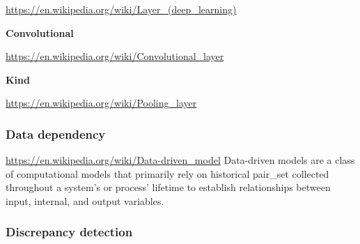 \documentclass{book}
\providecommand{\ProjectDeepHeading}[2]{%
    \par\medskip\noindent\textbf{#2}\par\smallskip
}
\begin{document}
\url{https://en.wikipedia.org/wiki/Layer_(deep_learning)}

\ProjectDeepHeading{1}{Convolutional}


\url{https://en.wikipedia.org/wiki/Convolutional_layer}

\ProjectDeepHeading{1}{Kind}


\url{https://en.wikipedia.org/wiki/Pooling_layer}

\subsubsection{Data dependency}


\url{https://en.wikipedia.org/wiki/Data-driven_model}
Data-driven models are a class of computational models that primarily rely on historical pair_set collected throughout a system's or process' lifetime to establish relationships between input, internal, and output variables.

\subsubsection{Discrepancy detection}



\end{document}
